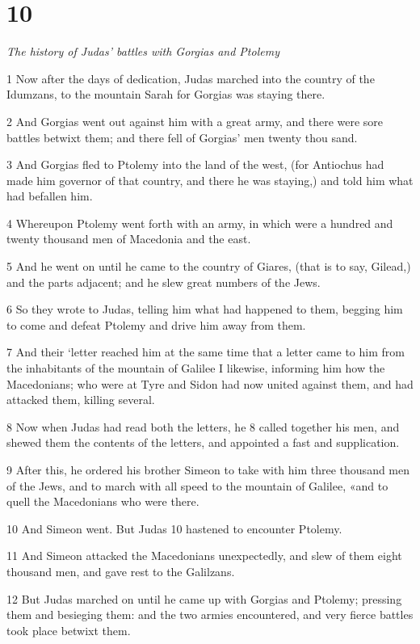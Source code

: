 \chapter{10}

\par \textit{The history of Judas’ battles with Gorgias and Ptolemy}

1 Now after the days of dedication, Judas marched into the country of the Idumzans, to the mountain Sarah for Gorgias was staying there. 

2 And Gorgias went out against him with a great army, and there were sore battles betwixt them; and there fell of Gorgias’ men twenty thou sand. 

3 And Gorgias fled to Ptolemy into the land of the west, (for Antiochus had made him governor of that country, and there he was staying,) and told him what had befallen him. 

4 Whereupon Ptolemy went forth with an army, in which were a hundred and twenty thousand men of Macedonia and the east. 

5 And he went on until he came to the country of Giares, (that is to say, Gilead,) and the parts adjacent; and he slew great numbers of the Jews. 

6 So they wrote to Judas, telling him what had happened to them, begging him to come and defeat Ptolemy and drive him away from them. 

7 And their ‘letter reached him at the same time that a letter came to him from the inhabitants of the mountain of Galilee I likewise, informing him how the Macedonians; who were at Tyre and Sidon had now united against them, and had attacked them, killing several. 

8 Now when Judas had read both the letters, he 8 called together his men, and shewed them the contents of the letters, and appointed a fast and supplication. 

9 After this, he ordered his brother Simeon to take with him three thousand men of the Jews, and to march with all speed to the mountain of Galilee, «and to quell the Macedonians who were there. 

10 And Simeon went. But Judas 10 hastened to encounter Ptolemy. 

11 And Simeon attacked the Macedonians unexpectedly, and slew of them eight thousand men, and gave rest to the Galilzans. 

12 But Judas marched on until he came up with Gorgias and Ptolemy; pressing them and besieging them: and the two armies encountered, and very fierce battles took place betwixt them. 

